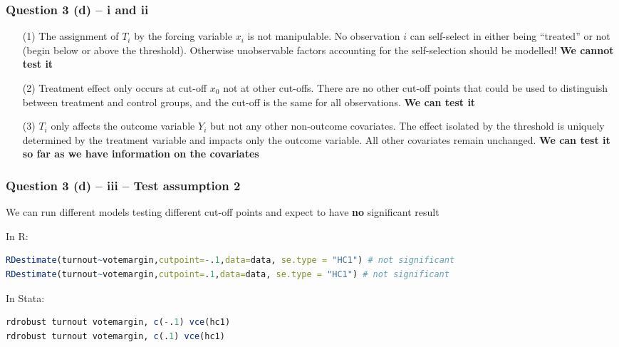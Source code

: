 \documentclass[xcolor=table,dvipsnames]{beamer}
\begin{document}
\begin{frame}
\frametitle{Question 3 (d) -- i and ii}
\begin{enumerate}
\item[(1)] The assignment of $T_i$ by the forcing variable $x_i$ is not manipulable. \pause No observation $i$ can self-select in either being ``treated'' or not (begin below or above the threshold). \pause Otherwise unobservable factors accounting for the self-selection should be modelled! \pause \textbf{We cannot test it} \pause
\item[(2)] Treatment effect only occurs at cut-off $x_0$ not at other cut-offs. \pause There are no other cut-off points that could be used to distinguish between treatment and control groups, and the cut-off is the same for all observations. \pause \textbf{We can test it} \pause
\item[(3)] $T_i$ only affects the outcome variable $Y_i$ but not any other non-outcome covariates. \pause The effect isolated by the threshold is uniquely determined by the treatment variable and impacts only the outcome variable. \pause All other covariates remain unchanged. \pause \textbf{We can test it so far as we have information on the covariates}
\end{enumerate}
\end{frame}

\begin{frame}[fragile]
\frametitle{Question 3 (d) -- iii -- Test assumption 2} \pause
We can run different models testing different cut-off points and expect to have \textbf{no} significant result \pause

In R:
\begin{lstlisting}[language=R]
RDestimate(turnout~votemargin,cutpoint=-.1,data=data, se.type = "HC1") # not significant
RDestimate(turnout~votemargin,cutpoint=.1,data=data, se.type = "HC1") # not significant
\end{lstlisting} \pause

In Stata:
\begin{lstlisting}[language=R]
rdrobust turnout votemargin, c(-.1) vce(hc1)
rdrobust turnout votemargin, c(.1) vce(hc1)
\end{lstlisting}
\end{frame}
\end{document}
